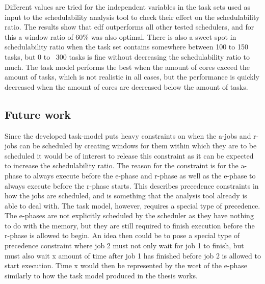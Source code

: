 \documentclass{kththesis}
\begin{document}
Different values are tried for the independent variables in the task sets used as input to the
schedulability analysis tool to check their effect on the schedulability ratio. The results show
that \acrshort{edf} outperforms all other tested schedulers, and for this a window ratio of 60\% was
also optimal. There is also a sweet spot in schedulability ratio when the task set contains
somewhere between 100 to 150 tasks, but 0 to ~300 tasks is fine without decreasing the
schedulability ratio to much. The task model performs the best when the amount of cores exceed the
amount of tasks, which is not realistic in all cases, but the performance is quickly decreased when
the amount of cores are decreased below the amount of tasks.







\subsection{Future work}\label{sec:future_work}

Since the developed task-model puts heavy constraints on when the \acrshort{a}-jobs and
\acrshort{r}-jobs can be scheduled by creating windows for them within which they are to be
scheduled it would be of interest to release this constraint as it can be expected to increase the
schedulability ratio. The reason for the constraint is for the \acrshort{a}-phase to always execute
before the \acrshort{e}-phase and \acrshort{r}-phase as well as the \acrshort{e}-phase to always
execute before the \acrshort{r}-phase starts. This describes precedence constraints in how the jobs
are scheduled, and is something that the analysis tool already is able to deal with. The task model,
however, requires a special type of precedence. The \acrshort{e}-phases are not explicitly scheduled
by the scheduler as they have nothing to do with the memory, but they are still required to finish
execution before the \acrshort{r}-phase is allowed to begin. An idea then could be to pose a special
type of precedence constraint where job 2 must not only wait for job 1 to finish, but must also wait
x amount of time after job 1 has finished before job 2 is allowed to start execution. Time x would
then be represented by the \acrshort{wcet} of the \acrshort{e}-phase similarly to how the task model
produced in the thesis works. 
\end{document}

